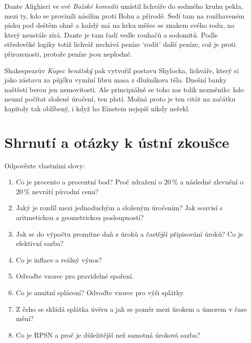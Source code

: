 Dante Alighieri ve své \textit{Božské komedii} umístil lichváře do sedmého kruhu pekla, mezi ty, kdo se provinili násilím proti Bohu a přírodě. Sedí tam na rozžhaveném písku pod deštěm ohně a každý má na krku měšec se znakem svého rodu, na který neustále zírá. Dante je tam řadí vedle rouhačů a sodomitů. Podle středověké logiky totiž lichvář nechává peníze `rodit' další peníze, což je proti přirozenosti, protože peníze jsou neplodné.

Shakespearův \textit{Kupec benátský} pak vytvořil postavu Shylocka, lichváře, který si jako zástavu za půjčku vymíní libru masa z dlužníkova těla. Dnešní banky naštěstí berou jen nemovitosti. Ale principiálně se toho zas tolik nezměnilo: kdo neumí počítat složené úročení, ten platí. Možná proto je ten citát na začátku kapitoly tak oblíbený, i když ho Einstein nejspíš nikdy neřekl.

\section{Shrnutí a otázky k ústní zkoušce}

\begin{problem}
  Odpovězte vlastními slovy:
  \begin{enumerate}
    \item Co je procento a procentní bod? Proč zdražení o $20\,\%$ a následné zlevnění o $20\,\%$ nevrátí původní cenu?
    \item Jaký je rozdíl mezi jednoduchým a složeným úročením? Jak souvisí s aritmetickou a geometrickou posloupností?
    \item Jak se do výpočtu promítne daň z úroků a častější připisování úroků? Co je efektivní sazba?
    \item Co je inflace a reálný výnos?
    \item Odvoďte vzorec pro pravidelné spoření.
    \item Co je anuitní splácení? Odvoďte vzorec pro výši splátky.
    \item Z čeho se skládá splátka úvěru a jak se poměr mezi úrokem a úmorem v čase mění?
    \item Co je RPSN a proč je důležitější než samotná úroková sazba?
  \end{enumerate}
\end{problem}
